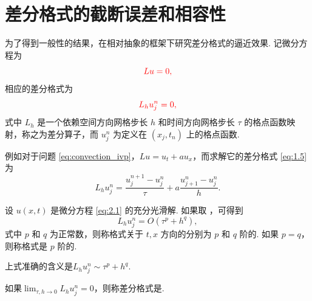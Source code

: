 \section{差分格式的截断误差和相容性}


为了得到一般性的结果，在相对抽象的框架下研究差分格式的逼近效果. 记微分方程为
\begin{equation}
    {\color{red} L u = 0, } \label{eq:2.1}
\end{equation}
相应的差分格式为
\begin{equation}
    {\color{red} L_h u_j^n = 0, } \label{eq:2.2}
\end{equation}
式中 $L_h$ 是一个依赖空间方向网格步长 $h$ 和时间方向网格步长 $\tau$ 的格点函数映射，称之为差分算子，而 $u_j^n$ 为定义在 $(x_j, t_n)$ 上的格点函数.

\begin{instance}[]
    例如对于问题 \eqref{eq:convection_ivp}，$Lu = u_t + au_x$，而求解它的差分格式 \eqref{eq:1.5} 为
    \[ L_h u_j^n = \frac{u_j^{n+1} - u_j^n}{\tau} + a \frac{u_{j+1}^n - u_j^n}{h}. \]
\end{instance}

\begin{definition}[截断误差]
    设 $u(x, t)$ 是微分方程 \eqref{eq:2.1} 的充分光滑解. 如果取 ，可得到
    \[ L_h u_j^n = O(\tau^p + h^q), \]
    式中 $p$ 和 $q$ 为正常数，则称格式关于 $t, x$ 方向的分别为 $p$ 和 $q$ 阶的. 如果 $p = q$，则称格式是 $p$ 阶的.
\end{definition}

\begin{remark}
    上式准确的含义是$L_h u_j^n \sim \tau^p + h^q.$
\end{remark}

\begin{definition}[相容性]
    如果$\lim_{\tau, h \to 0} L_h u_j^n = 0$，则称差分格式是.
\end{definition}

